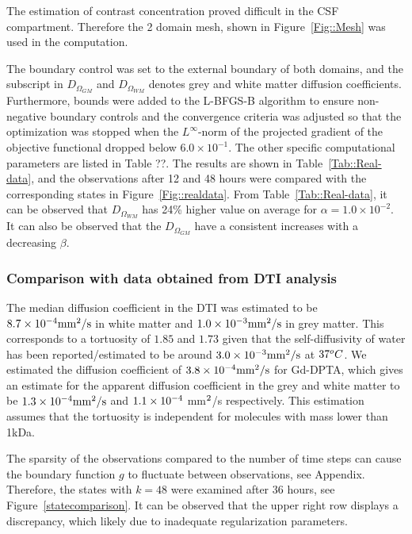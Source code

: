 \documentclass[12pt,a4paper]{article}
\def\mm2s{mm$\sp{2}$/s}
\begin{document}
The estimation of contrast concentration proved difficult in the CSF compartment. Therefore the 2 domain mesh, shown in Figure~\ref{Fig::Mesh} was used in the computation. 

The boundary control was set to the external boundary of both domains, and the subscript in $D_{\Omega_{GM}}$ and $D_{\Omega_{WM}}$ denotes grey and white matter diffusion coefficients. Furthermore, bounds were added to the L-BFGS-B algorithm to ensure non-negative boundary controls and the convergence criteria was adjusted so that the optimization was stopped when the $L^\infty$-norm of the projected gradient of the objective functional dropped below $6.0\times 10^{-1}$. The other specific  computational parameters are listed in Table ??.
The results are shown in Table~\ref{Tab::Real-data}, and the observations after 12 and 48 hours were compared with the corresponding states in Figure~\ref{Fig::realdata}. From Table~\ref{Tab::Real-data}, it can be observed that $D_{\Omega_{WM}}$ has 24\% higher value on average for $\alpha =1.0\times 10^{-2}$. It can also be observed that the $D_{\Omega_{GM}}$ have a consistent increases with a decreasing $\beta$.

\subsubsection{Comparison with data obtained from DTI analysis}
The median diffusion coefficient in the DTI was estimated to be 
$8.7\times 10\sp{-4} \mathrm{mm\sp{2}/s}$ 
in white matter and 
$1.0\times 10\sp{-3} \mathrm{mm\sp{2}/s}$ 
in grey matter. This corresponds to a tortuosity of $1.85$ and $1.73$ given that the self-diffusivity of water has been reported/estimated to be around $3.0\times 10\sp{-3}\mathrm{mm\sp{2}/s}$ at $37\sp{o}C$. We estimated the diffusion coefficient of $3.8\times 10\sp{-4} \mathrm{mm\sp{2}/s}$ for Gd-DPTA, which gives an estimate for the apparent diffusion coefficient in the grey and white matter to be $ 1.3\times 10\sp{-4}\mathrm{mm\sp{2}/s}$ and $1.1\times 10\sp{-4}$ \mm2s respectively. This estimation assumes that the tortuosity is independent for molecules with mass lower than 1kDa. 

The sparsity of the observations compared to the number of time steps can cause the boundary function $g$ to fluctuate between observations, see Appendix. Therefore, the states with $k=48$ were examined after 36 hours, see Figure~\ref{statecomparison}. It can be observed that the upper right row displays a discrepancy, which likely due to inadequate regularization parameters. 
\end{document}
